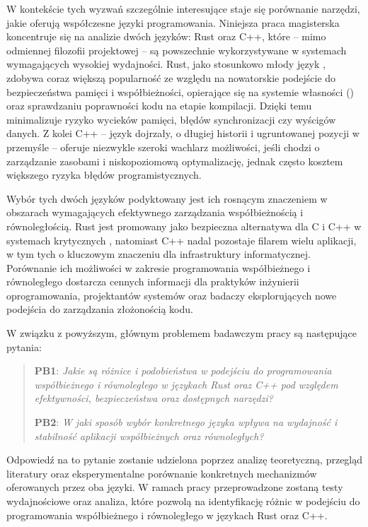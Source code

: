W kontekście tych wyzwań szczególnie interesujące staje się porównanie narzędzi, jakie oferują współczesne języki programowania. Niniejsza praca magisterska koncentruje się na analizie dwóch języków: Rust oraz C++, które – mimo odmiennej filozofii projektowej – są powszechnie wykorzystywane w systemach wymagających wysokiej wydajności. Rust, jako stosunkowo młody język \cite{}, zdobywa coraz większą popularność\cite{} ze względu na nowatorskie podejście do bezpieczeństwa pamięci i współbieżności, opierające się na systemie własności () oraz sprawdzaniu poprawności kodu na etapie kompilacji. Dzięki temu minimalizuje ryzyko wycieków pamięci, błędów synchronizacji czy wyścigów danych. Z kolei C++ – język dojrzały, o długiej historii i ugruntowanej pozycji w przemyśle – oferuje niezwykle szeroki wachlarz możliwości, jeśli chodzi o zarządzanie zasobami i niskopoziomową optymalizację, jednak często kosztem większego ryzyka błędów programistycznych.

Wybór tych dwóch języków podyktowany jest ich rosnącym znaczeniem w obszarach wymagających efektywnego zarządzania współbieżnością i równoległością. Rust jest promowany jako bezpieczna alternatywa dla C i C++ w systemach krytycznych \cite{}, natomiast C++ nadal pozostaje filarem wielu aplikacji, w tym tych o kluczowym znaczeniu dla infrastruktury informatycznej. Porównanie ich możliwości w zakresie programowania współbieżnego i równoległego dostarcza cennych informacji dla praktyków inżynierii oprogramowania, projektantów systemów oraz badaczy eksplorujących nowe podejścia do zarządzania złożonością kodu.

W związku z powyższym, głównym problemem badawczym pracy są następujące pytania:
\begin{quote}
    \item \textbf{PB1}: 
    \emph{Jakie są różnice i podobieństwa w podejściu do programowania współbieżnego i równoległego w językach Rust oraz C++ pod względem efektywności, bezpieczeństwa oraz dostępnych narzędzi?}
    \item \textbf{PB2}:
    \emph{W jaki sposób wybór konkretnego języka wpływa na wydajność i stabilność aplikacji współbieżnych oraz równoległych?}
\end{quote}
Odpowiedź na to pytanie zostanie udzielona poprzez analizę teoretyczną, przegląd literatury oraz eksperymentalne porównanie konkretnych mechanizmów oferowanych przez oba języki. W ramach pracy przeprowadzone zostaną testy wydajnościowe oraz analiza, które pozwolą na identyfikację różnic w podejściu do programowania współbieżnego i równoległego w językach Rust oraz C++.

